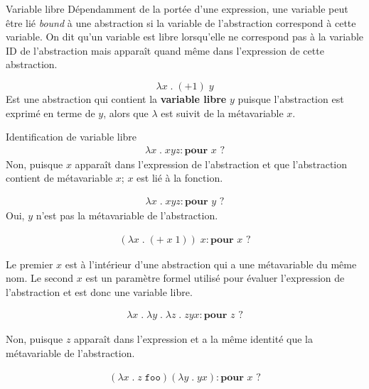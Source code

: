 \documentclass{report}
\begin{document}
\begin{multicols*}{3}
  \begin{Definitionx}{Variable libre}{}
      Dépendamment de la portée d'une expression, une variable peut être 
      lié \textit{bound} à une abstraction si la variable de l'abstraction 
      correspond à cette variable. On dit qu'un variable est libre 
      lorsqu'elle ne correspond pas à la variable ID de l'abstraction 
      mais apparaît quand même dans l'expression de cette abstraction. 

      $$ \lambda x \; . \; (+ 1) \; y  $$
      Est une abstraction qui contient la \textbf{variable libre} 
      $y$ puisque l'abstraction est exprimé en terme de $y$, alors 
      que $\lambda$ est suivit de la métavariable $x$. 
  \end{Definitionx}

  \begin{EExample}{Identification de variable libre}{}
    \begin{align*}
      \lambda x \; . \; x y z : \textbf{pour } x \text{ ?}  
    \end{align*}
    Non, puisque $x$ apparaît dans l'expression de l'abstraction 
    et que l'abstraction contient de métavariable $x$; $x$ est lié 
    à la fonction. 

    \begin{align*}
      \lambda x \; . \; x y z : \textbf{pour } y \text{ ?}                 
    \end{align*}
    Oui, $y$ n'est pas la métavariable de l'abstraction. 
      

    \begin{align*}
      (\lambda x \; . \; (+ \; x \; 1)) \; x : \textbf{pour } x \text{ ?}  
    \end{align*}

    Le premier $x$ est à l'intérieur d'une abstraction qui a 
    une métavariable du même nom. Le second $x$ est un paramètre formel 
    utilisé pour évaluer l'expression de l'abstraction et est donc 
    une variable libre. 

    \begin{align*}
      \lambda x \; . \; \lambda y \; . \; \lambda z \; . \; 
      z y x : \textbf{pour } z \text{ ?}  
    \end{align*}

    Non, puisque $z$ apparaît dans l'expression  et a la même 
    identité que la métavariable de l'abstraction. 

    \begin{align*}
      (\lambda x \; . \; z \; \texttt{foo})   (\lambda y \; . \; y x) 
     : \textbf{pour } x \text{ ?}  
    \end{align*}


\end{EExample}
\end{multicols*}
\end{document}
